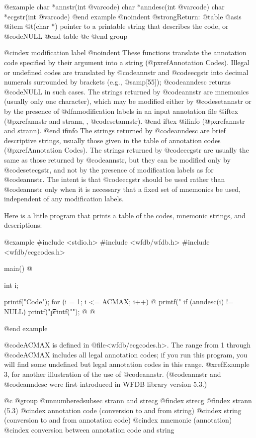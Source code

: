{{{{{{{{{@example
char *annstr(int @var{code})
char *anndesc(int @var{code})
char *ecgstr(int @var{code})
@end example
@noindent
@strong{Return:}
@table @asis
@item @t{(char *)}
pointer to a printable string that describes the code, or @code{NULL}
@end table
@c @end group

@cindex modification label
@noindent
These functions translate the annotation code specified by their argument
into a string (@pxref{Annotation Codes}).  Illegal or undefined codes
are translated by @code{annstr} and @code{ecgstr} into decimal numerals
surrounded by brackets (e.g., @samp{[55]}); @code{anndesc} returns @code{NULL}
in such cases.  The strings returned by @code{annstr} are mnemonics
(usually only one character), which may be modified either by @code{setannstr}
or by the presence of @dfn{modification labels} in an input annotation file
@iftex
(@pxref{annstr and strann, , @code{setannstr}}).
@end iftex
@ifinfo
(@pxref{annstr and strann}).
@end ifinfo
The strings returned by @code{anndesc} are brief descriptive strings,
usually those given in the table of annotation codes
(@pxref{Annotation Codes}).  The strings returned by
@code{ecgstr} are usually the same as those returned by @code{annstr},
but they can be modified only by @code{setecgstr}, and not by the
presence of modification labels as for @code{annstr}.  The intent is
that @code{ecgstr} should be used rather than @code{annstr} only when
it is necessary that a fixed set of mnemonics be used, independent of
any modification labels.

Here is a little program that prints a table of the codes, mnemonic
strings, and descriptions:

@example
#include <stdio.h>
#include <wfdb/wfdb.h>
#include <wfdb/ecgcodes.h>

main()
@{
    int i;

    printf("Code\tMnemonic\tDescription\n");
    for (i = 1; i <= ACMAX; i++) @{
        printf("%
        if (anndesc(i) != NULL)
            printf("\t\t%
        printf("\n");
    @}
@}
@end example

@code{ACMAX} is defined in @file{<wfdb/ecgcodes.h>}.  The range from 1
through @code{ACMAX} includes all legal annotation codes; if you run
this program, you will find some undefined but legal annotation codes in
this range. @xref{Example 3}, for another illustration of the use of
@code{annstr}.  (@code{annstr} and @code{anndesc} were first introduced
in WFDB library version 5.3.)

@c @group
@unnumberedsubsec strann and strecg
@findex strecg
@findex strann (5.3)
@cindex annotation code (conversion to and from string)
@cindex string (conversion to and from annotation code)
@cindex mnemonic (annotation)
@cindex conversion between annotation code and string

}}}}}}}}}
